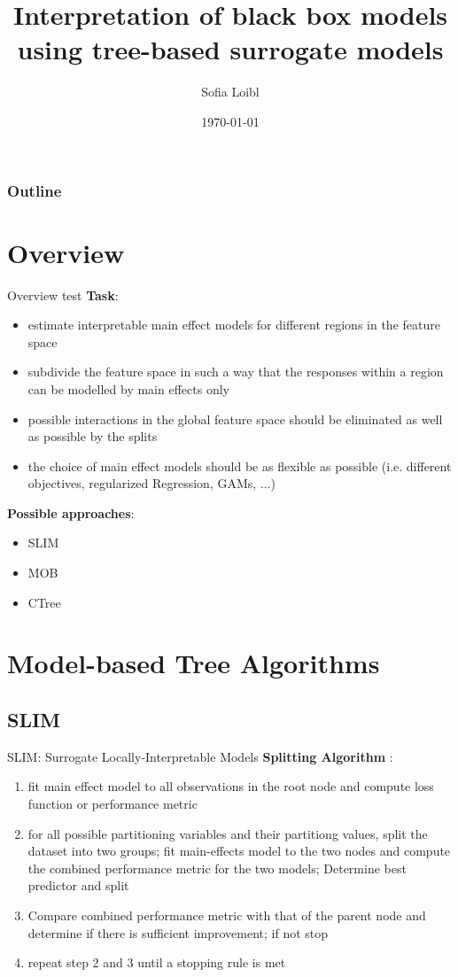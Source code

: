 \documentclass[9pt, xcolor=table]{beamer}
\title[Interpretation of black box models]{Interpretation of black box models using tree-based surrogate models}
\author[Sofia Loibl]{Sofia Loibl}
\institute[LMU]{LMU München}
\date{\today}
\begin{document}
\begin{frame}
\titlepage 
\end{frame}

\begin{frame}
\frametitle{Outline} 
\tableofcontents 
\end{frame}

\section{Overview}
\begin{frame}{Overview}
test
\textbf{Task}:
\begin{itemize}
    \item estimate interpretable main effect models for different regions in the feature space
    \item subdivide the feature space in such a way that the responses within a region can be modelled by main effects only
    \item possible interactions in the global feature space should be eliminated as well as possible by the splits
    \item the choice of main effect models should be as flexible as possible (i.e. different objectives, regularized Regression, GAMs, ...)
\end{itemize}
    
\vspace{0.5cm}

\textbf{Possible approaches}:
\begin{itemize}
    \item SLIM
    \item MOB
    \item CTree
\end{itemize}
\end{frame}


\section{Model-based Tree Algorithms}
\subsection{SLIM}
\begin{frame}{SLIM: Surrogate Locally-Interpretable Models}
\textbf{Splitting Algorithm} \citep{Hu.2020}:
\begin{enumerate}
    \item fit main effect model to all observations in the root node and compute loss function or performance metric
    \item for all possible partitioning variables and their partitiong values, split the dataset into two groups; fit main-effects model to the two nodes and compute the combined performance metric for the two models; Determine best predictor and split
    \item Compare combined performance metric with that of the parent node and determine if there is sufficient improvement; if not stop
    \item repeat step 2 and 3 until a stopping rule is met
\end{enumerate}
    
\end{frame}
\end{document}
